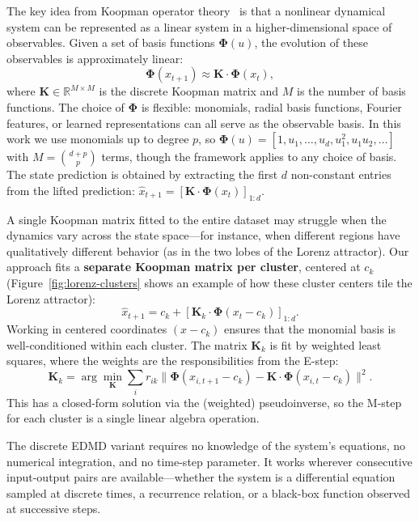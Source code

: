 \documentclass[11pt]{article}
\theoremstyle{definition}
\newcommand{\R}{\mathbb{R}}
\newcommand{\Phiv}{\boldsymbol{\Phi}}
\newcommand{\Kv}{\boldsymbol{K}}
\begin{document}
The key idea from Koopman operator theory~\cite{brunton2022modern} is that a nonlinear dynamical system can be represented as a linear system in a higher-dimensional space of observables. Given a set of basis functions $\Phiv(u)$, the evolution of these observables is approximately linear:
\begin{equation}
  \Phiv(x_{t+1}) \approx \Kv \cdot \Phiv(x_t),
\end{equation}
where $\Kv \in \R^{M \times M}$ is the discrete Koopman matrix and $M$ is the number of basis functions. The choice of $\Phiv$ is flexible: monomials, radial basis functions, Fourier features, or learned representations can all serve as the observable basis. In this work we use monomials up to degree $p$, so $\Phiv(u) = [1, u_1, \ldots, u_d, u_1^2, u_1 u_2, \ldots]$ with $M = \binom{d+p}{p}$ terms, though the framework applies to any choice of basis. The state prediction is obtained by extracting the first $d$ non-constant entries from the lifted prediction: $\hat{x}_{t+1} = [\Kv \cdot \Phiv(x_t)]_{1:d}$.

A single Koopman matrix fitted to the entire dataset may struggle when the dynamics vary across the state space---for instance, when different regions have qualitatively different behavior (as in the two lobes of the Lorenz attractor). Our approach fits a \textbf{separate Koopman matrix per cluster}, centered at $c_k$ (Figure~\ref{fig:lorenz-clusters} shows an example of how these cluster centers tile the Lorenz attractor):
\begin{equation}
  \hat{x}_{t+1} = c_k + [\Kv_k \cdot \Phiv(x_t - c_k)]_{1:d}.
\end{equation}
Working in centered coordinates $(x - c_k)$ ensures that the monomial basis is well-conditioned within each cluster. The matrix $\Kv_k$ is fit by weighted least squares, where the weights are the responsibilities from the E-step:
\begin{equation}
  \Kv_k = \arg\min_{\Kv} \sum_i r_{ik} \|\Phiv(x_{i,t+1} - c_k) - \Kv\cdot\Phiv(x_{i,t} - c_k)\|^2.
\end{equation}
This has a closed-form solution via the (weighted) pseudoinverse, so the M-step for each cluster is a single linear algebra operation.

The discrete EDMD variant requires no knowledge of the system's equations, no numerical integration, and no time-step parameter. It works wherever consecutive input-output pairs are available---whether the system is a differential equation sampled at discrete times, a recurrence relation, or a black-box function observed at successive steps.
\end{document}
